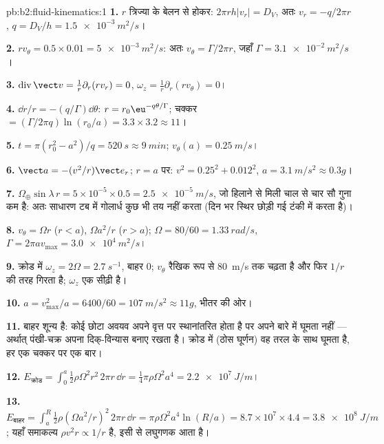 \begin{solution}{pb:b2:fluid-kinematics:1}
\textbf{1.} $r$ त्रिज्या के बेलन से होकर: $2\pi rh|v_r| = D_V$, अतः
$v_r = -q/2\pi r$, $q = D_V/h = \qty{1.5e-3}{m^2/s}$।

\textbf{2.} $rv_\theta = 0.5 \times 0.01 = \qty{5e-3}{m^2/s}$: अतः $v_\theta = \Gamma/2\pi r$,
जहाँ $\Gamma = \qty{3.1e-2}{m^2/s}$।

\textbf{3.} $\operatorname{div}\vect v = \frac1r\partial_r(rv_r) = 0$, $\omega_z =
\frac1r\partial_r(rv_\theta) = 0$।

\textbf{4.} $\dd r/r = -(q/\Gamma)\dd\theta$: $r = r_0\eu^{-q\theta/\Gamma}$; चक्कर
$= (\Gamma/2\pi q)\ln(r_0/a) = 3.3 \times 3.2 \approx 11$।

\textbf{5.} $t = \pi(r_0^2 - a^2)/q = \qty{520}{s} \approx \qty{9}{min}$; $v_\theta(a) =
\qty{0.25}{m/s}$।

\textbf{6.} $\vect a = -(v^2/r)\vect e_r$; $r = a$ पर: $v^2 = 0.25^2 + 0.012^2$,
$a = \qty{3.1}{m/s^2} \approx 0.3g$।

\textbf{7.} $\Omega_\oplus\sin\lambda\,r = 5 \times 10^{-5} \times 0.5 = \qty{2.5e-5}{m/s}$,
जो हिलाने से मिली चाल से चार सौ गुना कम है: अतः साधारण टब में
गोलार्ध कुछ भी तय नहीं करता (दिन भर स्थिर छोड़ी गई टंकी में करता है)।

\textbf{8.} $v_\theta = \Omega r$ ($r < a$), $\Omega a^2/r$ ($r > a$); $\Omega = 80/60
= \qty{1.33}{rad/s}$, $\Gamma = 2\pi av_{\max} = \qty{3.0e4}{m^2/s}$।

\textbf{9.} क्रोड में $\omega_z = 2\Omega = \qty{2.7}{s^{-1}}$, बाहर $0$;
$v_\theta$ रैखिक रूप से \qty{80}{m/s} तक चढ़ता है और फिर $1/r$ की तरह गिरता है; $\omega_z$
एक सीढ़ी है।

\textbf{10.} $a = v_{\max}^2/a = 6400/60 = \qty{107}{m/s^2} \approx 11g$, भीतर की ओर।

\textbf{11.} बाहर  शून्य है: कोई छोटा अवयव अपने वृत्त पर
स्थानांतरित होता है पर अपने बारे में घूमता नहीं --- अर्थात् पंखी-चक्र
अपना दिक्-विन्यास बनाए रखता है। क्रोड में (ठोस घूर्णन) वह तरल के साथ
घूमता है, हर एक चक्कर पर एक बार।

\textbf{12.} $E_{\text{क्रोड}} = \int_0^a\tfrac12\rho\Omega^2r^2\,2\pi r\,\dd r =
\tfrac14\pi\rho\Omega^2a^4 = \qty{2.2e7}{J/m}$।

\textbf{13.} $E_{\text{बाहर}} = \int_a^R\tfrac12\rho(\Omega a^2/r)^2\,2\pi r\,\dd r =
\pi\rho\Omega^2a^4\ln(R/a) = 8.7 \times 10^7 \times 4.4 = \qty{3.8e8}{J/m}$; यहाँ
समाकल्य $\rho v^2r \propto 1/r$ है, इसी से लघुगणक आता है।


\end{solution}
